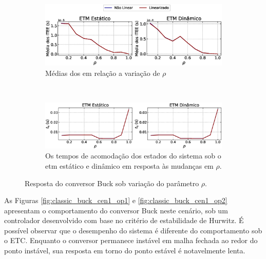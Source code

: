 \begin{figure}[H]
  \centering
  \captionsetup{justification=centering}
  \begin{subfigure}{1.\textwidth}
    \centering
    \includegraphics[width=1.\textwidth]{figuras/buck/itee-mean.eps}
    \caption{Médias dos  em relação a variação de $\rho$}
  \end{subfigure}
  \\[6pt]
  \begin{subfigure}{1.\textwidth} 
    \centering
    \includegraphics[width=1.\textwidth]{figuras/buck/ts.eps}
    \caption{Os tempos de acomodação dos estados do sistema sob o \acrshort{etm} estático e dinâmico em resposta às mudanças em $\rho$.}
  \end{subfigure}
  \caption{Resposta do conversor Buck sob variação do parâmetro $\rho$.}
  \label{fig:buck_converter_rho}
\end{figure}


As Figuras \ref{fig:classic_buck_cen1_op1} e \ref{fig:classic_buck_cen1_op2} apresentam o comportamento do conversor Buck neste cenário, sob um controlador desenvolvido com base no critério de estabilidade de Hurwitz. É possível observar que o desempenho do sistema é diferente do comportamento sob o ETC. Enquanto o conversor permanece instável em malha fechada ao redor do ponto instável, sua resposta em torno do ponto estável é notavelmente lenta.

